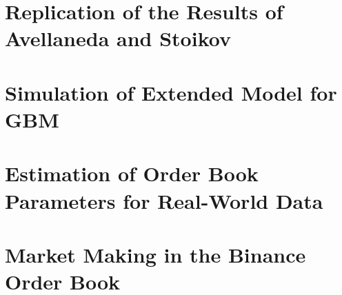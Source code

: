 \section{Replication of the Results of Avellaneda and Stoikov}
\section{Simulation of Extended Model for GBM}
\section{Estimation of Order Book Parameters for Real-World Data}
\section{Market Making in the Binance Order Book}